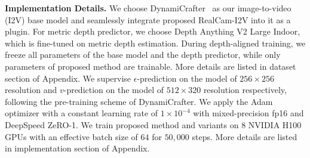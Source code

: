\noindent\textbf{Implementation Details.} We choose DynamiCrafter~\cite{Xing2023} as our image-to-video (I2V) base model and seamlessly integrate proposed RealCam-I2V into it as a plugin. 
For metric depth predictor, we choose Depth Anything V2 \cite{depth_anything_v2} Large Indoor, which is fine-tuned on metric depth estimation.
During depth-aligned training, we freeze all parameters of the base model and the depth predictor, while only parameters of proposed method are trainable. More details are listed in dataset section of Appendix.
We supervise \(\epsilon\)-prediction on the model of \(256 \times 256\) resolution and \(v\)-prediction on the model of \(512 \times 320\) resolution respectively, following the pre-training scheme of DynamiCrafter.
We apply the Adam optimizer with a constant learning rate of \(1 \times 10^{-4}\) with mixed-precision fp16 and DeepSpeed ZeRO-1.
We train proposed method and variants on \(8\) NVIDIA H100 GPUs with an effective batch size of \(64\) for \(50,000\) steps. More details are listed in implementation section of Appendix.





